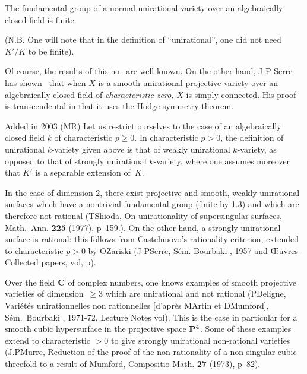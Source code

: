 \begin{corollary}
\label{XI.1.3}
The fundamental group of a normal unirational variety over
an algebraically closed field is finite.
\end{corollary}

(N.B. One will note that in the definition of ``unirational'', one
did not need $K'/K$ to be finite).

\begin{remarks}
\label{XI.1.4}
Of course, the results of this no.\ are well
known. On the other hand,
J-P\ptbl
Serre has shown~\cite{XI.10} that when $X$ is
a smooth unirational projective variety over an
algebraically closed field of \emph{characteristic zero,} $X$ is
simply connected. His proof is transcendental in that
it uses the Hodge symmetry theorem.

\lcrochetbf Added in 2003 (MR) Let us restrict ourselves to the case of an algebraically closed field $k$ of
characteristic $p\geq 0$. In characteristic $p>0$, the definition of
unirational $k$-variety given above is that of weakly unirational
$k$-variety, as opposed to that of strongly unirational
$k$-variety, where one assumes moreover that $K'$ is a separable
extension of~$K$.

In the case of dimension $2$, there exist projective and
smooth, weakly unirational surfaces which have a nontrivial fundamental group (finite
by 1.3) and which are therefore not rational (T\ptbl Shioda, On unirationality of supersingular surfaces, Math.~Ann. \textbf{225}
(1977), p--159.). On the other hand, a strongly
unirational surface is rational: this follows from Castelnuovo's
rationality criterion, extended to characteristic $p>0$ by O\ptbl Zariski (\cf J-P\ptbl Serre, S\'em. Bourbaki , 1957 and {\OE}uvres--Collected
papers, vol, p).

Over the field $\mathbf{C}$ of complex numbers, one knows examples of smooth projective
varieties of \hbox{dimension $\geq 3$} which are unirational and not
rational (\cf P\ptbl Deligne, Vari\'et\'es unirationnelles non
rationnelles [d'apr\`es M\ptbl Artin et D\ptbl Mumford],  S\'em.\ Bourbaki
, 1971-72, Lecture Notes vol). This is the case in particular for a
smooth cubic hypersurface in the projective space $\mathbf{P}^4$.
Some of these examples extend to characteristic $>0$ to give
strongly unirational non-rational varieties (\cf J.P\ptbl Murre, Reduction of the proof of the non-rationality of a non
singular cubic threefold to a result of Mumford, Compositio Math. \textbf{27}
(1973), p--82).


\end{remarks}
